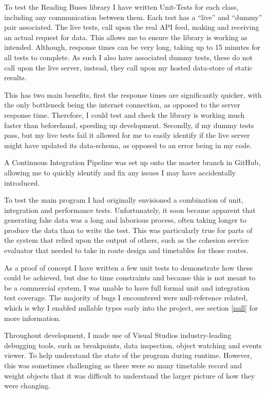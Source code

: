 \documentclass{article}
\begin{document}
To test the Reading Buses library I have written Unit-Tests for each class, including any communication between them. Each test has a ``live'' and ``dummy'' pair associated. The live tests, call upon the real API feed, making and receiving an actual request for data. This allows me to ensure the library is working as intended. Although, response times can be very long, taking up to 15 minutes for all tests to complete. As such I also have associated dummy tests, these do not call upon the live server, instead, they call upon my hosted data-store of static results.

\par 
This has two main benefits, first the response times are significantly quicker, with the only bottleneck being the internet connection, as opposed to the server response time. Therefore, I could test and check the library is working much faster than beforehand, speeding up development. Secondly, if my dummy tests pass, but my live tests fail it allowed for me to easily identify if the live server might have updated its data-schema, as opposed to an error being in my code. 

\par
A Continuous Integration Pipeline was set up onto the master branch in GitHub, allowing me to quickly identify and fix any issues I may have accidentally introduced. 

\par
To test the main program I had originally envisioned a combination of unit, integration and performance tests. Unfortunately, it soon became apparent that generating fake data was a long and laborious process, often taking longer to produce the data than to write the test. This was particularly true for parts of the system that relied upon the output of others, such as the cohesion service evaluator that needed to take in route design and timetables for those routes. 

\par 
As a proof of concept I have written a few unit tests to demonstrate how these could be achieved, but due to time constraints and because this is not meant to be a commercial system, I was unable to have full formal unit and integration test coverage. The majority of bugs I encountered were null-reference related, which is why I enabled nullable types early into the project, see section \ref{null} for more information.

\par 
Throughout development, I made use of Visual Studios industry-leading debugging tools, such as breakpoints, data inspection, object watching and events viewer. To help understand the state of the program during runtime. However, this was sometimes challenging as there were so many timetable record and weight objects that it was difficult to understand the larger picture of how they were changing.
\end{document}
